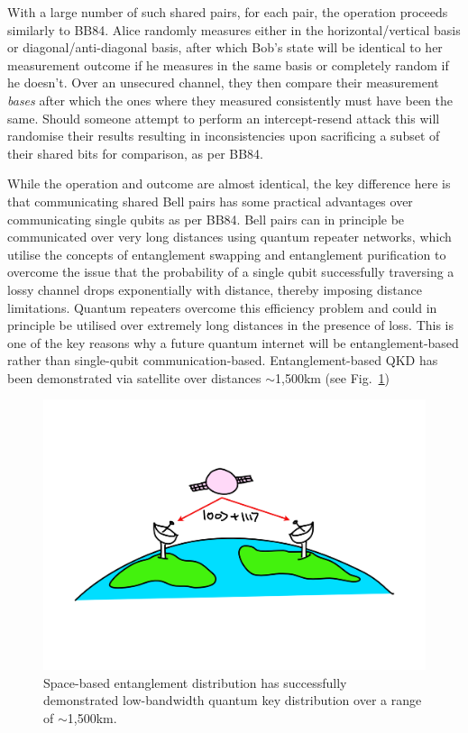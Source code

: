 With a large number of such shared pairs, for each pair, the operation proceeds similarly to BB84. Alice randomly measures either in the horizontal/vertical basis or diagonal/anti-diagonal basis, after which Bob's state will be identical to her measurement outcome if he measures in the same basis or completely random if he doesn't. Over an unsecured channel, they then compare their measurement \emph{bases} after which the ones where they measured consistently must have been the same. Should someone attempt to perform an intercept-resend attack this will randomise their results resulting in inconsistencies upon sacrificing a subset of their shared bits for comparison, as per BB84.

While the operation and outcome are almost identical, the key difference here is that communicating shared Bell pairs has some practical advantages over communicating single qubits as per BB84. Bell pairs can in principle be communicated over very long distances using quantum repeater networks, which utilise the concepts of entanglement swapping and entanglement purification to overcome the issue that the probability of a single qubit successfully traversing a lossy channel drops exponentially with distance, thereby imposing distance limitations. Quantum repeaters overcome this efficiency problem and could in principle be utilised over extremely long distances in the presence of loss. This is one of the key reasons why a future quantum internet \cite{bib:RohdeQI} will be entanglement-based rather than single-qubit communication-based. Entanglement-based QKD has been demonstrated via satellite over distances $\sim$1,500km (see Fig.~\ref{fig:satellite})

\begin{figure}[!htb]
	\centering
	\includegraphics[width=\columnwidth]{figures/Satellite}
	\caption{Space-based entanglement distribution has successfully demonstrated low-bandwidth quantum key distribution over a range of $\sim$1,500km.} \label{fig:satellite}
\end{figure}

